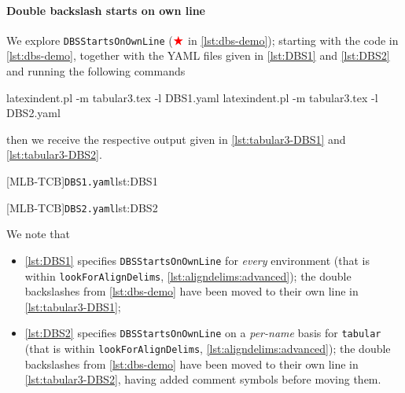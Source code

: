  \paragraph{Double backslash starts on own line}
  \begin{example}
  We explore \texttt{DBSStartsOnOwnLine} ($\color{red}\bigstar$ in \cref{lst:dbs-demo});
  starting with the code in \cref{lst:dbs-demo}, together with the YAML files given in
  \cref{lst:DBS1} and \cref{lst:DBS2} and running the following commands
   

  \begin{commandshell}
latexindent.pl -m tabular3.tex -l DBS1.yaml
latexindent.pl -m tabular3.tex -l DBS2.yaml
\end{commandshell}

  then we receive the respective output given in \cref{lst:tabular3-DBS1} and
  \cref{lst:tabular3-DBS2}.

  \begin{cmhtcbraster}
   [MLB-TCB]{\texttt{DBS1.yaml}}{lst:DBS1}
  \end{cmhtcbraster}

  \begin{cmhtcbraster}
   [MLB-TCB]{\texttt{DBS2.yaml}}{lst:DBS2}
  \end{cmhtcbraster}

  We note that
  \begin{itemize}
   \item \cref{lst:DBS1} specifies \texttt{DBSStartsOnOwnLine} for
         \emph{every} environment (that is within \texttt{lookForAlignDelims},
         \vref{lst:aligndelims:advanced});
         the double backslashes from \cref{lst:dbs-demo} have been moved to their own line in
         \cref{lst:tabular3-DBS1};
   \item \cref{lst:DBS2} specifies \texttt{DBSStartsOnOwnLine} on a
         \emph{per-name} basis for \texttt{tabular} (that is within \texttt{lookForAlignDelims},
         \vref{lst:aligndelims:advanced});
         the double backslashes from \cref{lst:dbs-demo} have been moved to their own line in
         \cref{lst:tabular3-DBS2}, having added comment symbols before moving them.
  \end{itemize}
  \end{example}

